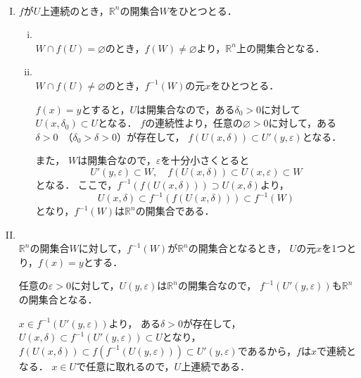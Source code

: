 \begin{tproof} \mbox{　}
    \begin{enumerate}[(I)]
        \item
              $f$が$U$上連続のとき，$\mathbb{R}^n$の開集合$W$をひとつとる．
              \begin{enumerate}[(i)]
                  \item \mbox{} \\
                        $ W \cap f(U) = \varnothing$のとき，$f(W) \ne \varnothing$より，$\mathbb{R}^n$上の開集合となる．
                  \item \mbox{} \\
                        $ W \cap f(U) \ne \varnothing$のとき，$f^{-1} (W)$の元$x$をひとつとる．

                        $ f(x)=y$とすると，$U$は開集合なので，ある$\delta_0 >0$に対して$U(x,\delta_0) \subset U$となる．
                        $f$の連続性より，任意の$\varnothing >0$に対して，ある$\delta >0$~（$\delta_0 >\delta >0$）が存在して，
                        $f(U(x,\delta)) \subset U' (y,\varepsilon)$となる．

                        また， $W$は開集合なので，$\varepsilon$を十分小さくとると
                        \[
                            U'(y,\varepsilon) \subset W,\quad f(U(x,\delta)) \subset U (x,\varepsilon) \subset W
                        \]
                        となる．
                        ここで，$f^{-1} (f(U(x,\delta))) \supset U(x,\delta)$より，
                        \[
                            U(x,\delta) \subset f^{-1} (f(U(x,\delta))) \subset f^{-1} (W)
                        \]
                        となり，$f^{-1} (W)$は$\mathbb{R}^n$の開集合である．
              \end{enumerate}
        \item \mbox{} \\
              $ \mathbb{R}^n$の開集合$W$に対して，$f^{-1} (W)$が$\mathbb{R}^n$の開集合となるとき，
              $U$の元$x$を1つとり，$f(x)=y$とする．

              任意の$\varepsilon >0$に対して，$U(y,\varepsilon)$は$\mathbb{R}^n$の開集合なので，
              $f^{-1} (U'(y,\varepsilon))$も$\mathbb{R}^n$の開集合となる．

              $x \in f^{-1} (U'(y,\varepsilon))$より，
              ある$\delta >0$が存在して，$U(x,\delta) \subset  f^{-1}(U'(y,\varepsilon)) \subset U$となり，
              $f(U(x,\delta)) \subset f(f^{-1}(U(y,\varepsilon))) \subset U'(y,\varepsilon)$であるから，$f$は$x$で連続となる．
              $x \in U$で任意に取れるので，$U$上連続である．
    \end{enumerate}
\end{tproof}



